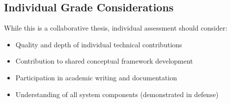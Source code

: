 \subsection{Individual Grade Considerations}
While this is a collaborative thesis, individual assessment should consider:
\begin{itemize}
\item Quality and depth of individual technical contributions
\item Contribution to shared conceptual framework development
\item Participation in academic writing and documentation
\item Understanding of all system components (demonstrated in defense)
\end{itemize}
